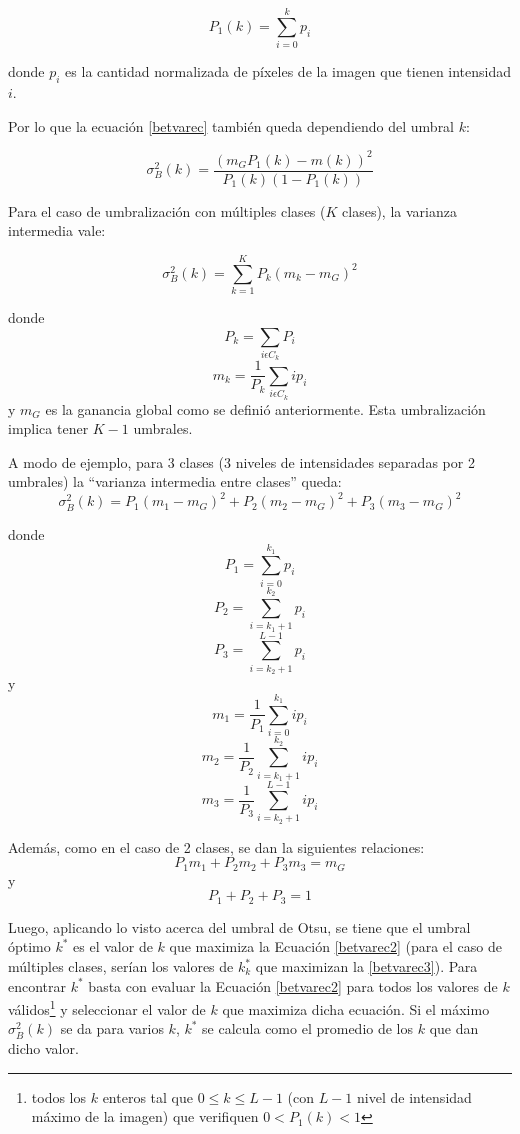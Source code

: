 \begin{equation}
 P_1(k) = \sum_{i=0}^kp_i 
 \label{peuno}
\end{equation}

donde $p_i$ es la cantidad normalizada de píxeles de la imagen que tienen intensidad $i$.

Por lo que la ecuación \ref{betvarec} también queda dependiendo del umbral $k$:

\begin{equation}
{\sigma}_B^2(k) = \frac{(m_GP_1(k) - m(k))^2}{P_1(k)(1-P_1(k))}
\label{betvarec2}
\end{equation}

Para el caso de umbralización con múltiples clases ($K$ clases), la varianza intermedia vale:

\begin{equation}
  {\sigma}_B^2(k) = \sum_{k=1}^{K}P_k(m_k-m_G)^2
  \label{betvarec3}
\end{equation}

donde $$P_k=\sum_{i{\epsilon}C_k}P_i$$ $$m_k = \frac{1}{P_k}\sum_{i{\epsilon}C_k}ip_i$$ y $m_G$ es la ganancia global como se definió anteriormente. Esta umbralización implica tener $K-1$ umbrales.

A modo de ejemplo, para 3 clases (3 niveles de intensidades separadas por 2 umbrales) la ``varianza intermedia entre clases'' queda:
\begin{equation}
  {\sigma}_B^2(k) = P_1(m_1 - m_G)^2 + P_2(m_2 - m_G)^2 + P_3(m_3 - m_G)^2
\end{equation}

donde $$P_1=\sum_{i=0}^{k_1}p_i$$ $$P_2=\sum_{i=k_1+1}^{k_2}p_i$$  $$P_3=\sum_{i=k_2+1}^{L-1}p_i$$ y $$m_1 = \frac{1}{P_1}\sum_{i=0}^{k_1}ip_i$$  $$m_2 = \frac{1}{P_2}\sum_{i=k_1+1}^{k_2}ip_i$$  $$m_3 = \frac{1}{P_3}\sum_{i=k_2+1}^{L-1}ip_i$$

Además, como en el caso de 2 clases, se dan la siguientes relaciones:
\begin{equation}
  P_1m_1 + P_2m_2 + P_3m_3 = m_G
\end{equation}
y
\begin{equation}
  P_1+P_2+P_3 = 1
\end{equation}

Luego, aplicando lo visto acerca del umbral de Otsu, se tiene que el umbral óptimo $k^*$ es el valor de $k$ que maximiza la Ecuación \ref{betvarec2} (para el caso de múltiples clases, serían los valores de $k_k^*$ que maximizan la \ref{betvarec3}). Para encontrar $k^*$ basta con evaluar la Ecuación \ref{betvarec2} para todos los valores de $k$ válidos\footnote{ todos los $k$ enteros tal que $0{\leq}k{\leq}L-1$ (con $L-1$ nivel de intensidad máximo de la imagen) que verifiquen $0<P_1(k)<1$ } y seleccionar el valor de $k$ que maximiza dicha ecuación. Si el máximo ${\sigma}_B^2(k)$ se da para varios $k$, $k^*$ se calcula como el promedio de los $k$ que dan dicho valor.

